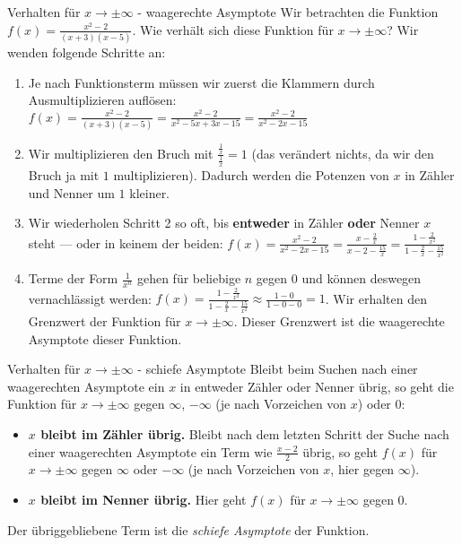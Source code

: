 \begin{bla}{Verhalten für $x \rightarrow \pm \infty$ - waagerechte Asymptote}
  Wir betrachten die Funktion $f(x)=\frac{x^2-2}{(x+3)(x-5)}$. Wie verhält sich diese Funktion für $x \rightarrow \pm \infty$?
  Wir wenden folgende Schritte an:
  \begin{enumerate}
    \item Je nach Funktionsterm müssen wir zuerst die Klammern durch Ausmultiplizieren auflösen: $f(x)=\frac{x^2-2}{(x+3)(x-5)}=\frac{x^2-2}{x^2-5x+3x-15}=\frac{x^2-2}{x^2-2x-15}$
    \item Wir multiplizieren den Bruch mit $\frac{\tfrac{1}{x}}{\tfrac{1}{x}}=1$ (das verändert nichts, da wir den Bruch ja mit $1$ multiplizieren). Dadurch werden die Potenzen von $x$ in Zähler und Nenner um $1$ kleiner.
    \item Wir wiederholen Schritt 2 so oft, bis \textbf{entweder} in Zähler \textbf{oder} Nenner $x$ steht --- oder in keinem der beiden: $f(x)=\frac{x^2-2}{x^2-2x-15}=\frac{x-\tfrac{2}{x}}{x-2-\tfrac{15}{x}}=\frac{1-\tfrac{2}{x^2}}{1-\tfrac{2}{x}-\tfrac{15}{x^2}}$
    \item Terme der Form $\frac{1}{x^n}$ gehen für beliebige $n$ gegen $0$ und können deswegen vernachlässigt werden: $f(x)=\frac{1-\tfrac{2}{x^2}}{1-\tfrac{2}{x}-\tfrac{15}{x^2}} \approx \frac{1-0}{1-0-0}=1$. Wir erhalten den Grenzwert der Funktion für $x \rightarrow \pm \infty$. Dieser Grenzwert ist die waagerechte Asymptote dieser Funktion.
  \end{enumerate}
\end{bla}

\begin{bla}{Verhalten für $x \rightarrow \pm \infty$ - schiefe Asymptote}
  Bleibt beim Suchen nach einer waagerechten Asymptote ein $x$ in entweder Zähler oder Nenner übrig, so geht die Funktion für $x \rightarrow \pm \infty$ gegen $\infty$, $-\infty$ (je nach Vorzeichen von $x$) oder $0$:
  \begin{itemize}
    \item \textbf{$x$ bleibt im Zähler übrig.} Bleibt nach dem letzten Schritt der Suche nach einer waagerechten Asymptote ein Term wie $\frac{x-2}{2}$ übrig, so geht $f(x)$ für $x \rightarrow \pm \infty$ gegen $\infty$ oder $-\infty$ (je nach Vorzeichen von $x$, hier gegen $\infty$).
    \item \textbf{$x$ bleibt im Nenner übrig.} Hier geht $f(x)$ für $x \rightarrow \pm \infty$ gegen $0$.
  \end{itemize}
  Der übriggebliebene Term ist die \emph{schiefe Asymptote} der Funktion.
\end{bla}



